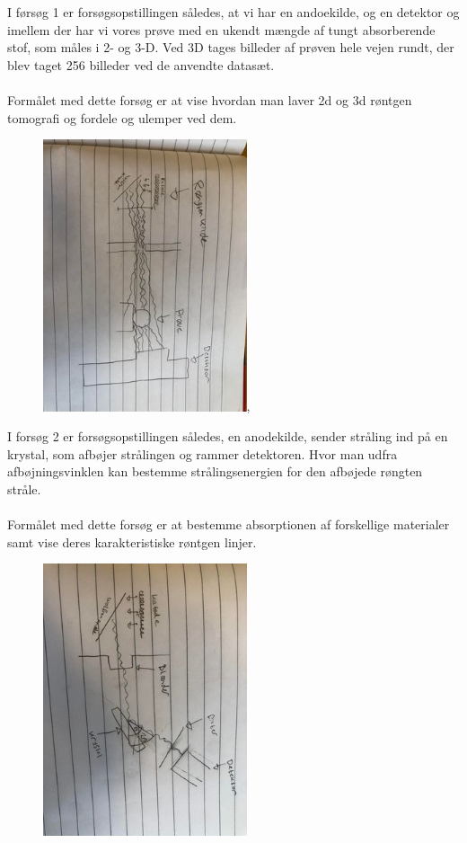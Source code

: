\documentclass[a4paper,twoside]{article}
\begin{document}
I førsøg 1 er forsøgsopstillingen således, at vi har en andoekilde, og en detektor og imellem der har vi vores prøve med en ukendt mængde af tungt absorberende stof, som måles i 2- og 3-D. Ved 3D tages billeder af prøven hele vejen rundt, der blev taget 256 billeder ved de anvendte datasæt. \\\\
Formålet med dette forsøg er at vise hvordan man laver 2d og 3d røntgen tomografi og fordele og ulemper ved dem. 
\begin{figure}[H]
\begin{centering}
\includegraphics[height=8cm,angle=90]{Forsøg 1.jpg},
\hspace{1cm}
\par\end{centering}
\end{figure}
I forsøg 2 er forsøgsopstillingen således, en anodekilde, sender stråling ind på en krystal, som afbøjer strålingen og rammer detektoren. Hvor man udfra afbøjningsvinklen kan bestemme strålingsenergien for den afbøjede røngten stråle. \\\\
Formålet med dette forsøg er at bestemme absorptionen af forskellige materialer samt vise deres karakteristiske røntgen linjer. 
\begin{figure}[H]
\begin{centering}
\includegraphics[height=8cm, angle=90]{Forsøg 2.jpg}
\hspace{1cm}
\par\end{centering}
\end{figure}
\end{document}
